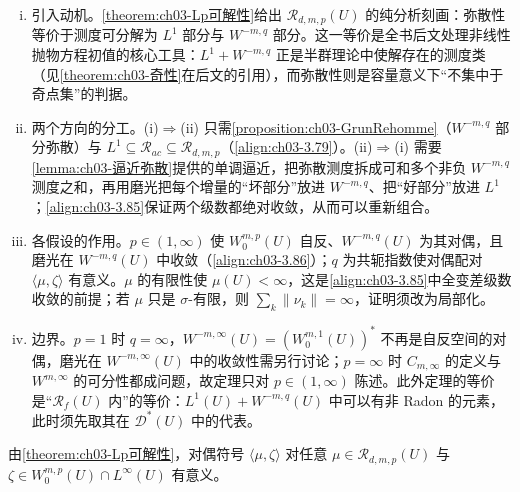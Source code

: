 \documentclass[../../main.tex]{subfiles}%
\begin{document}
\begin{remark}\label{remark:ch03-Lp可解性动机}
\begin{enumerate}[(i)]
\item 引入动机。\cref{theorem:ch03-Lp可解性}给出 $\mathscr{R}_{d,m,p}(U)$ 的纯分析刻画：弥散性等价于测度可分解为 $L^1$ 部分与 $W^{-m,q}$ 部分。这一等价是全书后文处理非线性抛物方程初值的核心工具：$L^1+W^{-m,q}$ 正是半群理论中使解存在的测度类（见\cref{theorem:ch03-奇性}在后文的引用），而弥散性则是容量意义下“不集中于奇点集”的判据。
\item 两个方向的分工。(i)$\Rightarrow$(ii) 只需\cref{proposition:ch03-GrunRehomme}（$W^{-m,q}$ 部分弥散）与 $L^1\subseteq\mathscr{R}_{ac}\subseteq\mathscr{R}_{d,m,p}$（\eqref{align:ch03-3.79}）。(ii)$\Rightarrow$(i) 需要\cref{lemma:ch03-逼近弥散}提供的单调逼近，把弥散测度拆成可和多个非负 $W^{-m,q}$ 测度之和，再用磨光把每个增量的“坏部分”放进 $W^{-m,q}$、把“好部分”放进 $L^1$；\eqref{align:ch03-3.85}保证两个级数都绝对收敛，从而可以重新组合。
\item 各假设的作用。$p\in(1,\infty)$ 使 $W^{m,p}_0(U)$ 自反、$W^{-m,q}(U)$ 为其对偶，且磨光在 $W^{-m,q}(U)$ 中收敛（\eqref{align:ch03-3.86}）；$q$ 为共轭指数使对偶配对 $\langle\mu,\zeta\rangle$ 有意义。$\mu$ 的有限性使 $\mu(U)<\infty$，这是\eqref{align:ch03-3.85}中全变差级数收敛的前提；若 $\mu$ 只是 $\sigma$-有限，则 $\sum_k\|\nu_k\|=\infty$，证明须改为局部化。
\item 边界。$p=1$ 时 $q=\infty$，$W^{-m,\infty}(U)=(W^{m,1}_0(U))^*$ 不再是自反空间的对偶，磨光在 $W^{-m,\infty}(U)$ 中的收敛性需另行讨论；$p=\infty$ 时 $C_{m,\infty}$ 的定义与 $W^{m,\infty}$ 的可分性都成问题，故定理只对 $p\in(1,\infty)$ 陈述。此外定理的等价是“$\mathscr{R}_f(U)$ 内”的等价：$L^1(U)+W^{-m,q}(U)$ 中可以有非 Radon 的元素，此时须先取其在 $\mathcal{D}^*(U)$ 中的代表。
\end{enumerate}
\end{remark}

\begin{remark}\label{remark:ch03-对偶意义}
由\cref{theorem:ch03-Lp可解性}，对偶符号 $\langle\mu,\zeta\rangle$ 对任意 $\mu\in\mathscr{R}_{d,m,p}(U)$ 与 $\zeta\in W^{m,p}_0(U)\cap L^\infty(U)$ 有意义。
\end{remark}
\end{document}
